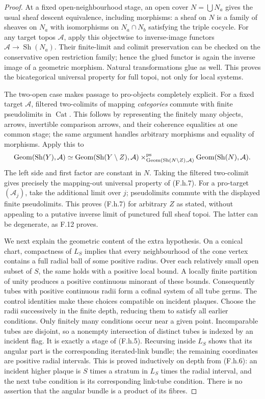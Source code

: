 \begin{proof}
At a fixed open-neighbourhood stage, an open cover $N=\bigcup N_a$
gives the usual sheaf descent equivalence, including morphisms:
a sheaf on $N$ is a family of sheaves on $N_a$ with isomorphisms on
$N_a\cap N_b$ satisfying the triple cocycle. For any target topos
$\mathcal A$, apply this objectwise to inverse-image functors
$\mathcal A\to\operatorname{Sh}(N_a)$. Their finite-limit and
colimit preservation can be checked on the conservative open
restriction family; hence the glued functor is again the inverse image
of a geometric morphism. Natural transformations glue as well. This
proves the bicategorical universal property for full topoi, not only
for local systems.

The two-open case makes passage to pro-objects completely explicit.
For a fixed target $\mathcal A$, filtered two-colimits of mapping
\emph{categories} commute with finite pseudolimits in
$\operatorname{Cat}$. This follows by representing the finitely many
objects, arrows, invertible comparison arrows, and their coherence
equalities at one common stage; the same argument handles arbitrary
morphisms and equality of morphisms. Apply this to
\[
 \operatorname{Geom}(\operatorname{Sh}(Y),\mathcal A)
 \simeq
 \operatorname{Geom}(\operatorname{Sh}(Y\setminus Z),\mathcal A)
 \mathbin{\times}^{\rm ps}_{
   \operatorname{Geom}(\operatorname{Sh}(N\setminus Z),\mathcal A)}
 \operatorname{Geom}(\operatorname{Sh}(N),\mathcal A).
\]
The left side and first factor are constant in $N$. Taking the filtered
two-colimit gives precisely the mapping-out universal property of
(F.h.7). For a pro-target $(\mathcal A_j)$, take the additional limit
over $j$; pseudolimits commute with the displayed finite pseudolimits.
This proves
(F.h.7) for arbitrary $Z$ as stated, without appealing to a putative
inverse limit of punctured full sheaf topoi. The latter can be
degenerate, as F.12 proves.

We next explain the geometric content of the extra hypothesis. On a
conical chart, compactness of $L_S$ implies that every neighbourhood of
the cone vertex contains a full radial ball of some positive radius.
Over each relatively small open subset of $S$, the same holds with a
positive local bound. A locally finite partition of unity produces a
positive continuous minorant of these bounds. Consequently tubes with
positive continuous radii form a cofinal system of all tube germs.
The control identities make these choices compatible on incident
plaques. Choose the radii successively in the finite depth, reducing
them to satisfy all earlier conditions. Only finitely many conditions
occur near a given point. Incomparable tubes are disjoint, so a
nonempty intersection of distinct tubes is indexed by an incident
flag. It is exactly a stage of (F.h.5). Recursing inside $L_S$ shows
that its angular part is the corresponding iterated-link bundle;
the remaining coordinates are positive radial intervals. This is
proved inductively on depth from (F.h.6): an incident higher plaque
is $S$ times a stratum in $L_S$ times the radial interval, and the
next tube condition is its corresponding link-tube condition. There
is no assertion that the angular bundle is a product of its fibres.


\end{proof}
